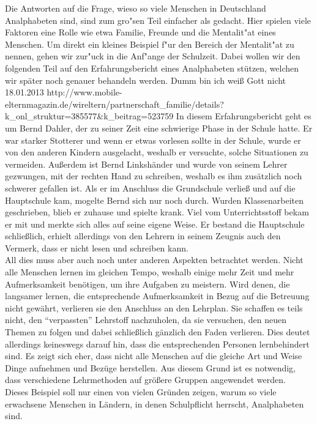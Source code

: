 Die Antworten auf die Frage, wieso so viele Menschen in Deutschland Analphabeten sind, sind zum gro"sen Teil einfacher als gedacht. Hier spielen viele Faktoren eine Rolle wie etwa Familie, Freunde und die Mentalit"at eines Menschen. Um direkt ein kleines Beispiel f"ur den Bereich der Mentalit"at zu nennen, gehen wir zur"uck in die Anf"ange der Schulzeit. Dabei wollen wir den folgenden Teil auf den Erfahrungsbericht eines Analphabeten stützen, welchen wir später noch genauer behandeln werden.
				{Dumm bin ich weiß Gott nicht}
				{18.01.2013 }
				{http://www.mobile-elternmagazin.de/wireltern/partnerschaft_familie/details?k_onl_struktur=385577&k_beitrag=523759}
In diesem Erfahrungsbericht geht es um Bernd Dahler, der zu seiner Zeit eine schwierige Phase in der Schule hatte. Er war starker Stotterer und wenn er etwas vorlesen sollte in der Schule, wurde er von den anderen Kindern ausgelacht, weshalb er versuchte, solche Situationen zu vermeiden. Außerdem ist Bernd Linkshänder und wurde von seinem Lehrer gezwungen, mit der rechten Hand zu schreiben, weshalb es ihm zusätzlich noch schwerer gefallen ist. Als er im Anschluss die Grundschule verließ und auf die Hauptschule kam, mogelte Bernd sich nur noch durch. Wurden Klassenarbeiten geschrieben, blieb er zuhause und spielte krank. Viel vom Unterrichtsstoff bekam er mit und merkte sich alles auf seine eigene Weise. Er bestand die Hauptschule schließlich, erhielt allerdings von den Lehrern in seinem Zeugnis auch den Vermerk, dass er nicht lesen und schreiben kann.\\
All dies muss aber auch noch unter anderen Aspekten betrachtet werden.
Nicht alle Menschen lernen im gleichen Tempo, weshalb einige mehr Zeit und mehr Aufmerksamkeit benötigen, um ihre Aufgaben zu meistern. Wird denen, die langsamer lernen, die entsprechende Aufmerksamkeit in Bezug auf die Betreuung nicht gewährt, verlieren sie den Anschluss an den Lehrplan. Sie schaffen es teils nicht, den "`verpassten"' Lehrstoff nachzuholen, da sie versuchen, den neuen Themen zu folgen und dabei schließlich gänzlich den Faden verlieren. Dies deutet allerdings keineswegs darauf hin, dass die entsprechenden Personen lernbehindert sind. Es zeigt sich eher, dass nicht alle Menschen auf die gleiche Art und Weise Dinge aufnehmen und Bezüge herstellen. Aus diesem Grund ist es notwendig, dass verschiedene Lehrmethoden auf größere Gruppen angewendet werden.\\

Dieses Beispiel soll nur einen von vielen Gründen zeigen, warum so viele erwachsene Menschen in Ländern, in denen Schulpflicht herrscht, Analphabeten sind. \\

